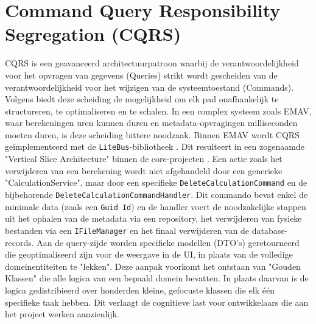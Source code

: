 \section{Command Query Responsibility Segregation (CQRS)}
CQRS is een geavanceerd architectuurpatroon waarbij de verantwoordelijkheid voor het opvragen van gegevens (Queries) strikt wordt gescheiden van de verantwoordelijkheid voor het wijzigen van de systeemtoestand (Commands). 
Volgens \textcite{fowlerCQRS} biedt deze scheiding de mogelijkheid om elk pad onafhankelijk te structureren, te optimaliseren en te schalen. 
In een complex systeem zoals EMAV, waar berekeningen uren kunnen duren en metadata-opvragingen milliseconden moeten duren, is deze scheiding bittere noodzaak.
Binnen EMAV wordt CQRS geïmplementeerd met de \texttt{LiteBus}-bibliotheek \autocite{litebus}. 
Dit resulteert in een zogenaamde "Vertical Slice Architecture" binnen de core-projecten \autocite{jimmyBogardVerticalSlice}. 
Een actie zoals het verwijderen van een berekening wordt niet afgehandeld door een generieke "CalculationService", maar door een specifieke \texttt{DeleteCalculationCommand} en de bijbehorende \texttt{DeleteCalculationCommandHandler}. 
Dit commando bevat enkel de minimale data (zoals een \texttt{Guid Id}) en de handler voert de noodzakelijke stappen uit \: het ophalen van de metadata via een repository, het verwijderen van fysieke bestanden via een \texttt{IFileManager} en het finaal verwijderen van de database-records.
Aan de query-zijde worden specifieke modellen (DTO's) geretourneerd die geoptimaliseerd zijn voor de weergave in de UI, in plaats van de volledige domeinentiteiten te "lekken". 
Deze aanpak voorkomt het ontstaan van "Gouden Klassen" die alle logica van een bepaald domein bevatten. 
In plaats daarvan is de logica gedistribieerd over honderden kleine, gefocuste klassen die elk één specifieke taak hebben. 
Dit verlaagt de cognitieve last voor ontwikkelaars die aan het project werken aanzienlijk.
